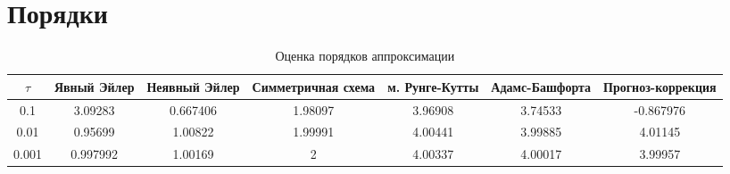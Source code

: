 \documentclass{article}
\begin{document}
	\section{Порядки}
	\begin{table}[h]
		\centering
		\footnotesize
		\caption{Оценка порядков аппроксимации}
		\begin{tabular}{|c|c|c|c|c|c|c|}
			\hline
			$\tau$ &Явный Эйлер& Неявный Эйлер & Симметричная схема
			& м. Рунге-Кутты & Адамс-Башфорта & Прогноз-коррекция \\ \hline
			0.1 & 3.09283 & 0.667406 & 1.98097 & 3.96908 & 3.74533 &  -0.867976 \\ \hline
0.01 & 0.95699 & 1.00822 & 1.99991 & 4.00441 & 3.99885 & 4.01145 \\ \hline
0.001 & 0.997992 & 1.00169 & 2 & 4.00337 & 4.00017 & 3.99957 \\ \hline
		\end{tabular}
	\end{table}
\end{document}
